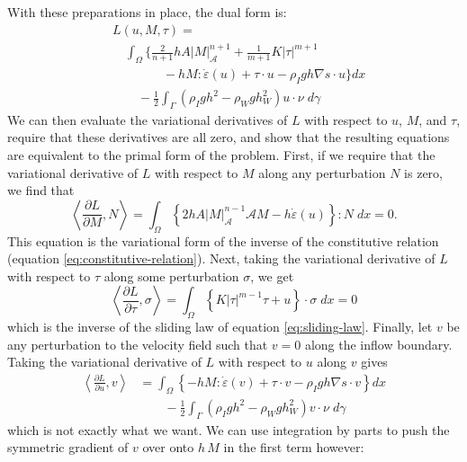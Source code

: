 \documentclass[twocolumn,letterpaper]{igs}
\begin{document}
With these preparations in place, the dual form is:
\begin{align}
    & L(u, M, \tau) = \nonumber\\
    & \quad \int_\Omega\Bigg\{\frac{2}{n + 1}hA|M|_{\mathscr A}^{n + 1} + \frac{1}{m + 1}K|\tau|^{m + 1} \nonumber\\
    & \qquad\qquad - hM:\dot\varepsilon(u) + \tau\cdot u - \rho_Igh\nabla s\cdot u\Bigg\}dx \nonumber \\
    & \qquad - \frac{1}{2}\int_\Gamma\left(\rho_Igh^2 - \rho_Wgh_W^2\right)u\cdot\nu\;d\gamma
    \label{eq:ssa-dual-form}
\end{align}
We can then evaluate the variational derivatives of $L$ with respect to $u$, $M$, and $\tau$, require that these derivatives are all zero, and show that the resulting equations are equivalent to the primal form of the problem.
First, if we require that the variational derivative of $L$ with respect to $M$ along any perturbation $N$ is zero, we find that
\begin{equation}
    \left\langle\frac{\partial L}{\partial M}, N\right\rangle = \int_\Omega\left\{2hA|M|_{\mathscr{A}}^{n - 1}\mathscr{A}M - h\dot\varepsilon(u)\right\} : N\; dx = 0.
\end{equation}
This equation is the variational form of the inverse of the constitutive relation (equation \eqref{eq:constitutive-relation}).
Next, taking the variational derivative of $L$ with respect to $\tau$ along some perturbation $\sigma$, we get
\begin{equation}
    \left\langle\frac{\partial L}{\partial\tau}, \sigma\right\rangle = \int_\Omega\left\{K|\tau|^{m - 1}\tau + u\right\}\cdot\sigma\;dx = 0
\end{equation}
which is the inverse of the sliding law of equation \eqref{eq:sliding-law}.
Finally, let $v$ be any perturbation to the velocity field such that $v = 0$ along the inflow boundary.
Taking the variational derivative of $L$ with respect to $u$ along $v$ gives
\begin{align}
    \left\langle\frac{\partial L}{\partial u}, v\right\rangle & = \int_\Omega\left\{-hM : \dot\varepsilon(v) + \tau\cdot v - \rho_Igh\nabla s\cdot v\right\}dx \nonumber\\
    & \qquad -\frac{1}{2}\int_{\Gamma}\left(\rho_Igh^2 - \rho_Wgh_W^2\right)v\cdot\nu\;d\gamma
\end{align}
which is not exactly what we want.
We can use integration by parts to push the symmetric gradient of $v$ over onto $h\,M$ in the first term however:
\end{document}
